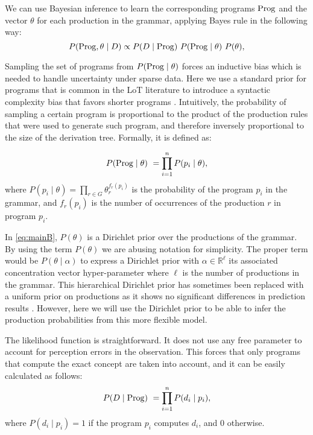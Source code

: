 We can use Bayesian inference to learn the corresponding programs ${\rm Prog}$ and the vector $\theta$ for each production in the grammar, applying Bayes rule in the following way:
%
\begin{equation}
\label{eq:mainB}
P(\Prog,\theta \mid D) \propto P(D \mid \Prog)\ P(\Prog \mid \theta)\ P(\theta),
\end{equation}
%

Sampling the set of programs from $P({\rm Prog} \mid \theta)$ forces an inductive bias which is needed to handle uncertainty under sparse data. Here we use a standard prior for programs that is common in the LoT literature to introduce a syntactic complexity bias that favors shorter programs \cite{goodman2008rational,overlan2017learning}. Intuitively, the probability of sampling a certain program is proportional to the product of the production rules that were used to generate such program, and therefore inversely proportional to the size of the derivation tree. Formally, it is defined as:

%
\begin{equation}
\label{eqC}
P({\rm Prog} \mid \theta)\ = \prod\limits_{i = 1}^n P(p_i \mid \theta),
\end{equation}
%
where $P(p_i \mid \theta) = \prod\limits_{r \in G} \theta^{f_r(p_i)}_{r}$ is the probability of the program $p_i$ in the grammar, and $f_r(p_i)$ is the number of occurrences of the production $r$ in program $p_i$.

In \eqref{eq:mainB}, $P(\theta)$ is a Dirichlet prior over the productions of the grammar. By using the term $P(\theta)$ we are abusing notation for simplicity. The proper term would be $P(\theta \mid \alpha)$ to express a Dirichlet prior with $\alpha \in \mathbb{R}^\ell$ its associated concentration vector hyper-parameter where $\ell$ is the number of productions in the grammar. This hierarchical Dirichlet prior has sometimes been replaced with a uniform prior on productions as it shows no significant differences in prediction results \cite{piantadosi2012bootstrapping,yildirim2015learning}. However, here we will use the Dirichlet prior to be able to infer the production probabilities from this more flexible model.

The likelihood function is straightforward. It does not use any free parameter to account for perception errors in the observation. This forces that only programs that compute the exact concept are taken into account, and it can be easily calculated as follows:
\begin{equation}
\label{eqD}
P(D \mid {\rm Prog})\ = \prod\limits_{i = 1}^n P(d_i \mid p_i),
\end{equation}
where $P(d_i \mid p_i) = 1 $ if the program $p_i$ computes $d_i$, and 0 otherwise.

